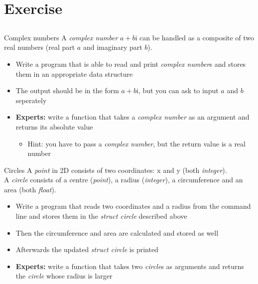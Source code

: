 \section{Exercise}
\subsection{}
\begin{frame}{Complex numbers}
	A \textit{complex number} $a + b\mathrm{i}$ can be handled as a composite of two real numbers (real part $a$ and imaginary part $b$).
	\begin{itemize}
		\item Write a program that is able to read and print \textit{complex number}s and stores them in an appropriate data structure
		\item The output should be in the form $a + b\mathrm{i}$, but you can ask to input $a$ and $b$ seperately
		\item \textbf{Experts:} write a function that takes a \textit{complex number} as an argument and returns its absolute value
		\begin{itemize}
			\item<2-> Hint: you have to pass a \textit{complex number}, but the return value is a real number
		\end{itemize}
	\end{itemize}
\end{frame}
\begin{frame}{Circles}
	A \textit{point} in 2D consists of two coordinates: x and y (both \textit{integer}). \\
	A \textit{circle} consists of a centre (\textit{point}), a radius (\textit{integer}), a circumference and an area (both \textit{float}).
	\begin{itemize}
		\item Write a program that reads two coordinates and a radius from the command line and stores them in the \textit{struct circle} described above
		\item Then the circumference and area are calculated and stored as well
		\item Afterwards the updated \textit{struct circle} is printed
		\item \textbf{Experts:} write a function that takes two \textit{circle}s as arguments and returns the \textit{circle} whose radius is larger
	\end{itemize}
\end{frame}


